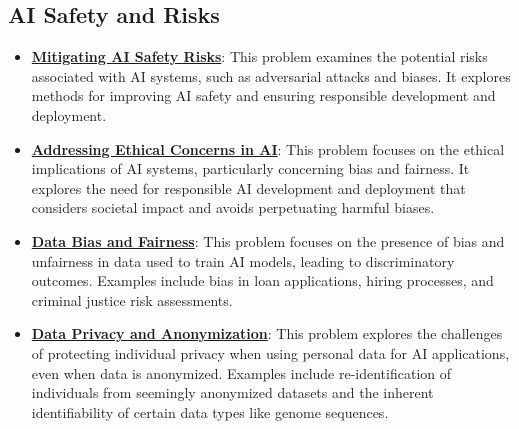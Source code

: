 \documentclass{article}%
\begin{document}
\subsection{AI Safety and Risks}%
\label{subsec:AISafetyandRisks}%
\begin{itemize}[leftmargin=*]%
\item \href{https://purdue.brightspace.com/d2l/common/assets/pdfjs-d2l-dist/1.0.14-legacy/web/viewer.html?file=\%2Fcontent\%2Fenforced\%2F1095467-wl.202510.CS.24300.001\%2F02L2-Intro.pdf\%3Fou\%3D1095467\&lang=en-us\&container=d2l-fileviewer-rendered-pdf\&fullscreen=d2l-fileviewer-rendered-pdf-dialog\&height=667#page=19}{\textbf{Mitigating AI Safety Risks}}: This problem examines the potential risks associated with AI systems, such as adversarial attacks and biases. It explores methods for improving AI safety and ensuring responsible development and deployment.%
\item \href{https://purdue.brightspace.com/d2l/common/assets/pdfjs-d2l-dist/1.0.14-legacy/web/viewer.html?file=\%2Fcontent\%2Fenforced\%2F1095467-wl.202510.CS.24300.001\%2F02L2-Intro.pdf\%3Fou\%3D1095467\&lang=en-us\&container=d2l-fileviewer-rendered-pdf\&fullscreen=d2l-fileviewer-rendered-pdf-dialog\&height=667#page=20}{\textbf{Addressing Ethical Concerns in AI}}: This problem focuses on the ethical implications of AI systems, particularly concerning bias and fairness. It explores the need for responsible AI development and deployment that considers societal impact and avoids perpetuating harmful biases.%
\item \href{https://purdue.brightspace.com/d2l/common/assets/pdfjs-d2l-dist/1.0.14-legacy/web/viewer.html?file=\%2Fcontent\%2Fenforced\%2F1095467-wl.202510.CS.24300.001\%2F16L2-ethics.pdf\%3Fou\%3D1095467\&lang=en-us\&container=d2l-fileviewer-rendered-pdf\&fullscreen=d2l-fileviewer-rendered-pdf-dialog\&height=667#page=2}{\textbf{Data Bias and Fairness}}: This problem focuses on the presence of bias and unfairness in data used to train AI models, leading to discriminatory outcomes. Examples include bias in loan applications, hiring processes, and criminal justice risk assessments.%
\item \href{https://purdue.brightspace.com/d2l/common/assets/pdfjs-d2l-dist/1.0.14-legacy/web/viewer.html?file=\%2Fcontent\%2Fenforced\%2F1095467-wl.202510.CS.24300.001\%2F16L2-ethics.pdf\%3Fou\%3D1095467\&lang=en-us\&container=d2l-fileviewer-rendered-pdf\&fullscreen=d2l-fileviewer-rendered-pdf-dialog\&height=667#page=10}{\textbf{Data Privacy and Anonymization}}: This problem explores the challenges of protecting individual privacy when using personal data for AI applications, even when data is anonymized. Examples include re-identification of individuals from seemingly anonymized datasets and the inherent identifiability of certain data types like genome sequences.%

\end{itemize}
\end{document}
